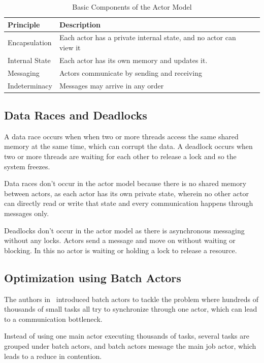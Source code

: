\begin{table}[!htp]
    \centering
    \caption{Basic Components of the Actor Model}
    \label{tab:actor_model}
    \begin{tabularx}{\textwidth}{|l|X|X|}
        \hline
        \textbf{Principle} & \textbf{Description} \\
        \hline
        Encapsulation & Each actor has a private internal state, and no actor can view it \\
        \hline
        Internal State & Each actor has its own memory and updates it. \\
        \hline
        Messaging & Actors communicate by sending and receiving \\
        \hline
        Indeterminacy & Messages may arrive in any order \\
        \hline
        
    \end{tabularx}
\end{table}

\subsection{Data Races and Deadlocks}
A data race occurs when when two or more threads access the same shared memory at the same time, which can corrupt the data. A deadlock occurs when two or more threads are waiting for each other to release a lock and so the system freezes. 

Data races don't occur in the actor model because there is no shared memory between actors, as each actor has its own private state, wherein no other actor can directly read or write that state and every communication happens through messages only. 

Deadlocks don't occur in the actor model as there is asynchronous messaging without any locks. Actors send a message and move on without waiting or blocking. In this no actor is waiting or holding a lock to release a resource.

\subsection{Optimization using Batch Actors}
The authors in~\cite{10820772} introduced batch actors to tackle the problem where hundreds of thousands of small tasks all try to synchronize through one actor, which can lead to a communication bottleneck.

Instead of using one main actor executing thousands of tasks, several tasks are grouped under batch actors, and batch actors message the main job actor, which leads to a reduce in contention. 

